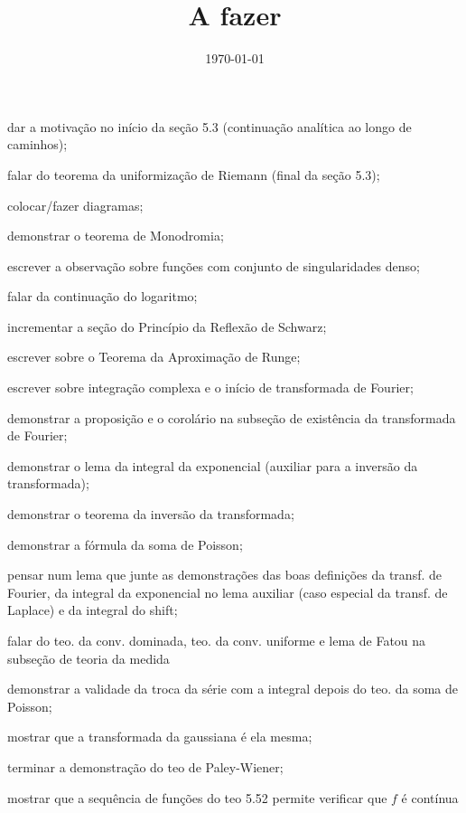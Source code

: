 \documentclass[12pt,a4paper]{article}
\title{A fazer}
\author{}
\date{\today}
\newcommand{\cmark}{\ding{51}}%
\newcommand{\done}{\rlap{$\square$}{\raisebox{2pt}{\large\hspace{1pt}\cmark}}%
\hspace{-2.5pt}}
\begin{document}
\maketitle

\begin{todolist}
    \item dar a motivação no início da seção 5.3 (continuação analítica ao longo
    de caminhos);
    \item falar do teorema da uniformização de Riemann (final da seção 5.3); 
    \item colocar/fazer diagramas;
    \item[\done] demonstrar o teorema de Monodromia;
    \item[\done] escrever a observação sobre funções com conjunto de singularidades denso;
    \item[\done] falar da continuação do logaritmo;
    \item[\done] incrementar a seção do Princípio da Reflexão de Schwarz;
    \item[\done] escrever sobre o Teorema da Aproximação de Runge;
    \item[\done] escrever sobre integração complexa e o início de transformada de Fourier;
    \item[\done] demonstrar a proposição e o corolário na subseção de existência da transformada de Fourier;
    \item[\done] demonstrar o lema da integral da exponencial (auxiliar para a inversão da transformada);
    \item[\done] demonstrar o teorema da inversão da transformada;
    \item[\done] demonstrar a fórmula da soma de Poisson;
    \item pensar num lema que junte as demonstrações das boas definições da transf. de Fourier,
          da integral da exponencial no lema auxiliar (caso especial da transf. de Laplace) e
          da integral do shift;
    \item falar do teo. da conv. dominada, teo. da conv. uniforme e lema de
    Fatou na subseção de teoria da medida
    \item demonstrar a validade da troca da série com a integral depois do teo. da soma de Poisson;
    \item[\done] mostrar que a transformada da gaussiana é ela mesma;
    \item terminar a demonstração do teo de Paley-Wiener;
    \item[\done] mostrar que a sequência de funções do teo 5.52 
    permite verificar que $f$ é contínua

\end{todolist}
\end{document}
